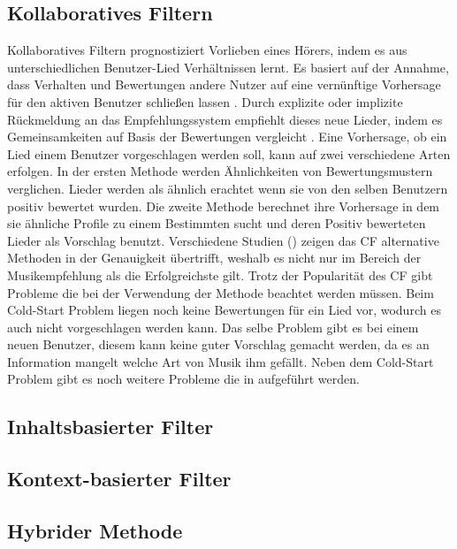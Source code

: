 \documentclass[twosided,a4,10pt]{article}
\begin{document}
\begin{multicols}{2}
\subsection{Kollaboratives Filtern}
Kollaboratives Filtern prognostiziert Vorlieben eines Hörers, indem es aus unterschiedlichen Benutzer-Lied Verhältnissen lernt. Es basiert auf der Annahme, dass Verhalten und Bewertungen andere Nutzer auf eine vernünftige Vorhersage für den aktiven Benutzer schließen lassen \cite{celma}. Durch explizite oder implizite Rückmeldung an das Empfehlungssystem empfiehlt dieses neue Lieder, indem es Gemeinsamkeiten auf Basis der Bewertungen vergleicht \cite{mcfee}.\newline
Eine Vorhersage, ob ein Lied einem Benutzer vorgeschlagen werden soll, kann auf zwei verschiedene Arten erfolgen. In der ersten Methode werden Ähnlichkeiten von Bewertungsmustern verglichen. Lieder werden als ähnlich erachtet wenn sie von den selben Benutzern positiv bewertet wurden. Die zweite Methode berechnet ihre Vorhersage in dem sie ähnliche Profile zu einem Bestimmten sucht und deren Positiv bewerteten Lieder als Vorschlag benutzt. \cite{ekstrandand}\newline
Verschiedene Studien (\cite{mcfee}\cite{barrington}) zeigen das CF alternative Methoden in der Genauigkeit übertrifft, weshalb es nicht nur im Bereich der Musikempfehlung als die Erfolgreichste gilt.\newline
Trotz der Popularität des CF gibt Probleme die bei der Verwendung der Methode beachtet werden müssen. Beim Cold-Start Problem liegen noch keine Bewertungen für ein Lied vor, wodurch es auch nicht vorgeschlagen werden kann. Das selbe Problem gibt es bei einem neuen Benutzer, diesem kann keine guter Vorschlag gemacht werden, da es an Information mangelt welche Art von Musik ihm gefällt. \cite{celma} Neben dem Cold-Start Problem gibt es noch weitere Probleme die in \cite{celma} aufgeführt werden.

\subsection{Inhaltsbasierter Filter}

\subsection{Kontext-basierter Filter}

\subsection{Hybrider Methode}


\end{multicols}
\end{document}
